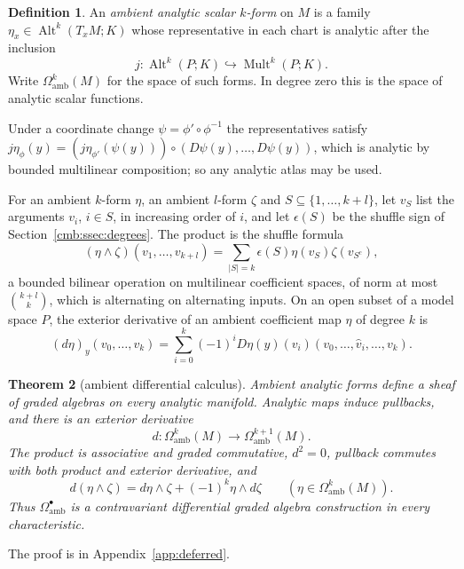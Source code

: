 \documentclass[11pt]{amsart}
\newtheorem{theorem}{Theorem}[section]
\theoremstyle{definition}
\newtheorem{definition}[theorem]{Definition}
\theoremstyle{remark}
\numberwithin{equation}{section}
\newcommand{\Alt}{\operatorname{Alt}}
\newcommand{\Mult}{\operatorname{Mult}}
\newcommand{\abs}[1]{\lvert #1\rvert}
\theoremstyle{plain}
\theoremstyle{definition}
\theoremstyle{plain}
\begin{document}
\begin{definition}
An \emph{ambient analytic scalar $k$\nobreakdash-form} on $M$ is a family $\eta_x\in\Alt^k(T_xM;K)$ whose representative in each chart is analytic after the inclusion
\[
 j\colon\Alt^k(P;K)\hookrightarrow\Mult^k(P;K).
\]
Write $\Omega^k_{\mathrm{amb}}(M)$ for the space of such forms. In degree zero this is the space of analytic scalar functions.
\end{definition}

Under a coordinate change $\psi=\phi'\circ\phi^{-1}$ the representatives satisfy $j\eta_\phi(y)=(j\eta_{\phi'}(\psi(y)))\circ(D\psi(y),\ldots,D\psi(y))$, which is analytic by bounded multilinear composition; so any analytic atlas may be used.

For an ambient $k$\nobreakdash-form $\eta$, an ambient $l$\nobreakdash-form $\zeta$ and $S\subseteq\{1,\ldots,k+l\}$, let $v_S$ list the arguments $v_i$, $i\in S$, in increasing order of $i$, and let $\epsilon(S)$ be the shuffle sign of Section~\ref{cmb:ssec:degrees}. The product is the shuffle formula
\begin{equation}\label{eq:form-shuffle}
 (\eta\wedge\zeta)(v_1,\ldots,v_{k+l})
 =\sum_{\abs{S}=k}\epsilon(S)\eta(v_S)\zeta(v_{S^c}),
\end{equation}
a bounded bilinear operation on multilinear coefficient spaces, of norm at most $\binom{k+l}{k}$, which is alternating on alternating inputs. On an open subset of a model space $P$, the exterior derivative of an ambient coefficient map $\eta$ of degree $k$ is
\begin{equation}\label{eq:exterior-derivative}
 (d\eta)_y(v_0,\ldots,v_k)
 =\sum_{i=0}^k(-1)^iD\eta(y)(v_i)
       (v_0,\ldots,\widehat v_i,\ldots,v_k).
\end{equation}

\begin{theorem}[ambient differential calculus]\label{thm:ambient-forms}
Ambient analytic forms define a sheaf of graded algebras on every analytic manifold. Analytic maps induce pullbacks, and there is an exterior derivative
\[
 d\colon\Omega^k_{\mathrm{amb}}(M)\longrightarrow\Omega^{k+1}_{\mathrm{amb}}(M).
\]
The product is associative and graded commutative, $d^2=0$, pullback commutes with both product and exterior derivative, and
\[
 d(\eta\wedge\zeta)=d\eta\wedge\zeta+(-1)^k\eta\wedge d\zeta
 \qquad(\eta\in\Omega^k_{\mathrm{amb}}(M)).
\]
Thus $\Omega^\bullet_{\mathrm{amb}}$ is a contravariant differential graded algebra construction in every characteristic.
\end{theorem}
The proof is in Appendix~\ref{app:deferred}.
\end{document}
